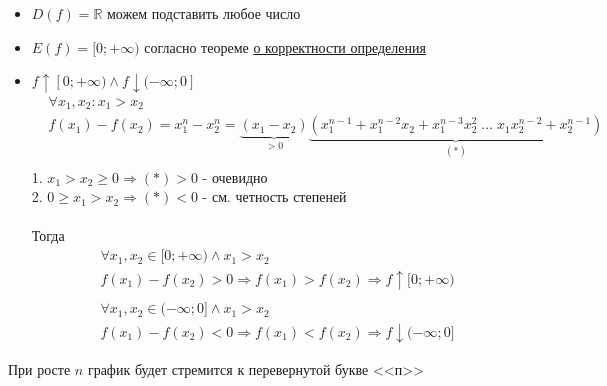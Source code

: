 \begin{itemize}
    \item $D(f) = \mathbb{R}$
    можем подставить любое число
    \item $E(f) = [0;+\infty)$
    согласно теореме \hyperref[thm:1.2.2]{о корректности определения}
    \item $f \uparrow [0;+\infty) \land f \downarrow (-\infty; 0]$
    \begin{align*}
        &\forall x_1, x_2 : x_1 > x_2 \\
        &f(x_1) - f(x_2) = x_1^n - x_2^n = \underbrace{(x_1 - x_2)}_{> 0} \underbrace{(x_1^{n-1} + x_1^{n-2}x_2 + x_1^{n-3}x_2^2 \; \dots \; x_1x_2^{n-2} + x_2^{n-1})}_{(*)} \\
    \end{align*}
    1. $x_1 > x_2 \ge 0 \Rightarrow (*) > 0$ - очевидно \\
    2. $ 0 \ge x_1 > x_2 \Rightarrow (*) < 0$ - см. четность степеней \\ \\
    Тогда
    \begin{align*}
        &\forall x_1, x_2 \in [0; +\infty) \land x_1 > x_2 \\
        &f(x_1) - f(x_2) > 0 \Rightarrow f(x_1) > f(x_2) \Rightarrow f \uparrow [0; +\infty) \\ \\
        &\forall x_1, x_2 \in (-\infty; 0] \land x_1 > x_2 \\
        &f(x_1) - f(x_2) < 0 \Rightarrow f(x_1) < f(x_2) \Rightarrow f \downarrow (-\infty; 0]
    \end{align*}
\end{itemize}

\begin{remark}
    При росте $n$ график будет стремится к перевернутой букве <<п>>
\end{remark}

\newpage

